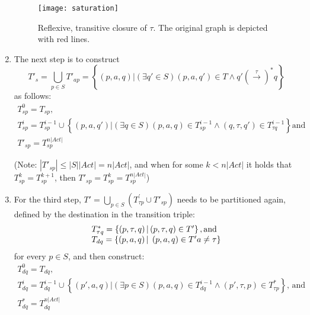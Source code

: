 \begin{enumerate}
\begin{figure}[h]
\centering
\texttt{[image: saturation]}
\caption{Reflexive, transitive closure of $\tau$. The original graph is depicted with red lines.}
\label{fig:saturation}
\end{figure}

\item The next step is to construct
\begin{equation*}\label{eq:tap}
		T'_{s}=\bigcup_{p\in \mathit{S}}T'_{ap}=\left\{\left(p,a,q\right)|\left(\exists q'\in \mathit{S}\right)\left(p,a,q'\right)\in T\wedge q'\left(\stackrel{\tau}{\rightarrow}\right)^{*}q\right\}
\end{equation*}
as follows:
\begin{equation*}
	\begin{array}{lcl}
		T^{0}_{sp}=T_{sp},\\
		T^{i}_{sp}=T^{i-1}_{sp}\cup \left\{\left(p,a,q'\right)|\left(\exists q\in \mathit{S}\right)\left(p,a,q\right)\in T^{i-1}_{sp}\wedge \left(q,\tau,q'\right)\in T^{i-1}_{\tau q}\right\} \text{and} \\
		T'_{sp}=T^{n|\mathit{Act}|}_{sp}
	\end{array}
\end{equation*}

(Note: $|T'_{sp}|\leq |\mathit{S}||\mathit{Act}| = n|\mathit{Act}|$, and when for some $k < n|\mathit{Act}|$ it holds that $T^{k}_{sp}=T^{k+1}_{sp}$, then $T'_{sp}=T^{k}_{sp}=T^{n|\mathit{Act}|}_{sp}$)\\

\item For the third step, $T'=\bigcup_{p\in \mathit{S}}\left(T^{'}_{\mathit{\tau p}}\cup T'_{sp}\right)$ needs to be partitioned again, defined by the destination in the transition triple:
\begin{equation*}
	\begin{array}{lcl}
		T^{*}_{\mathit{\tau q}}=\left\{\left(p,\tau,q\right)|\left(p,\tau,q\right)\in T'\right\}, \text{and}\\
		T_{dq}=\left\{\left(p,a,q\right)|\hspace{1mm}\left(p,a,q\right)\in T' a\neq\tau\right\}				    
	\end{array}
\end{equation*}
for every $p\in \mathit{S}$, and then construct:
\begin{equation*}
	\begin{array}{lcl}
		T^{0}_{dq}=T_{dq},\\
		T^{i}_{dq}=T^{i-1}_{dq}\cup\left\{\left(p',a,q\right)|\left(\exists p\in \mathit{S}\right)\left(p,a,q\right)\in T^{i-1}_{dq}\wedge\left(p',\tau,p\right)\in T^{*}_{\tau p}\right\} \text{, and}\\
		T^{*}_{dq}=T^{n|\mathit{Act}|}_{dq}
	\end{array}
\end{equation*}
\end{enumerate}

